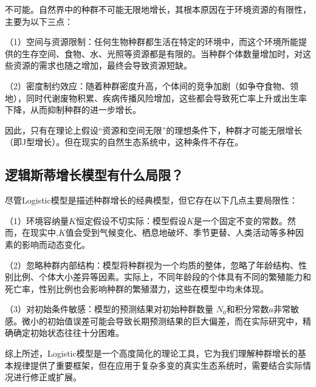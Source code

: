 \documentclass[10.5pt]{config}
\begin{document}
不可能。自然界中的种群不可能无限地增长，其根本原因在于环境资源的有限性，主要为以下三点：

（1）空间与资源限制：任何生物种群都生活在特定的环境中，而这个环境所能提供的生存空间、食物、水、光照等资源都是有限的。当种群个体数量增加时，对这些资源的需求也随之增加，最终会导致资源短缺。

（2）密度制约效应：随着种群密度升高，个体间的竞争加剧（如争夺食物、领地），同时代谢废物积累、疾病传播风险增加，这些都会导致死亡率上升或出生率下降，从而抑制种群的进一步增长。

因此，只有在理论上假设“资源和空间无限”的理想条件下，种群才可能无限增长（即J型增长）。但在现实的自然生态系统中，这种条件不存在。

\subsection{逻辑斯蒂增长模型有什么局限？}

尽管Logistic模型是描述种群增长的经典模型，但它存在以下几点主要局限性：

（1）环境容纳量$K$恒定假设不切实际：模型假设$K$是一个固定不变的常数。然而，在现实中,$K$值会受到气候变化、栖息地破坏、季节更替、人类活动等多种因素的影响而动态变化。

（2）忽略种群内部结构：模型将种群视为一个均质的整体，忽略了年龄结构、性别比例、个体大小差异等因素。实际上，不同年龄段的个体具有不同的繁殖能力和死亡率，性别比例也会影响种群的繁殖潜力，这些在模型中均未体现。

（3）对初始条件敏感：模型的预测结果对初始种群数量 $N_0$和积分常数$a$非常敏感。微小的初始值误差可能会导致长期预测结果的巨大偏差，而在实际研究中，精确确定初始状态往往十分困难。

综上所述，Logistic模型是一个高度简化的理论工具，它为我们理解种群增长的基本规律提供了重要框架，但在应用于复杂多变的真实生态系统时，需要结合实际情况进行修正或扩展。
\end{document}
